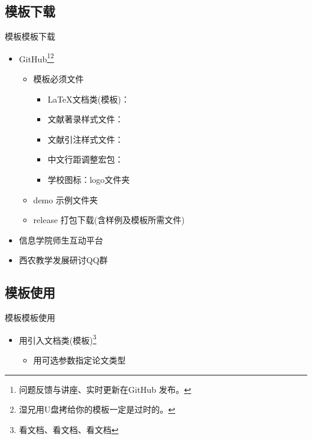 \documentclass[fontset = none, xcolor=svgnames, t, aspectratio=169]{ctexbeamer}
\begin{document}
\subsection[模板下载]{模板下载}
\begin{frame}[t]{\nwafuthesis 模板}{模板下载}
  \stretchon
  \begin{itemize}
  \item \faGithub GitHub\footnote[frame, 1]{问题反馈与讲座、实时更新在GitHub
      发布。}\footnote[frame, 2]{湿兄用U盘拷给你的模板一定是过时的。}
    \begin{itemize}
    \item 模板必须文件
      \begin{itemize}
      \item \LaTeX 文档类(模板)： 
      \item 文献著录样式文件：
      \item 文献引注样式文件：
      \item 中文行距调整宏包：
      \item 学校图标：logo文件夹
      \end{itemize}
    \item demo 示例文件夹
    \item release 打包下载(含样例及模板所需文件)
    \end{itemize}
  \item {信息学院师生互动平台}
  \item 西农教学发展研讨QQ群
  \end{itemize}
  \stretchoff
\end{frame}

\subsection[模板使用]{模板使用}
\begin{frame}[fragile]{\nwafuthesis 模板}{模板使用}
  \begin{itemize}  
  \item 用引入文档类(模板)\footnote[frame, 1]{看文档、看文档、看文档}
    \begin{itemize}
    \item 用可选参数指定论文类型
    \end{itemize} 
  \end{itemize}
  \begin{center}
    \begin{minipage}[h]{0.95\linewidth}      
    \end{minipage}
  \end{center}
\end{frame}
\end{document}

